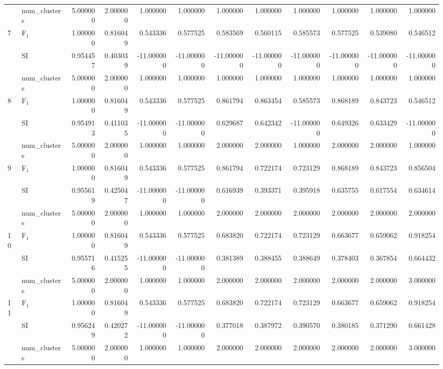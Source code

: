 \begin{tabular}{llrrrrrrrrrr}
 & num_clusters & 5.000000 & 2.000000 & 1.000000 & 1.000000 & 1.000000 & 1.000000 & 1.000000 & 1.000000 & 1.000000 & 1.000000 \\
\multirow[c]{3}{*}{7} & F$_1$ & 1.000000 & 0.816049 & 0.543336 & 0.577525 & 0.583569 & 0.560115 & 0.585573 & 0.577525 & 0.539080 & 0.546512 \\
 & SI & 0.954457 & 0.403039 & -11.000000 & -11.000000 & -11.000000 & -11.000000 & -11.000000 & -11.000000 & -11.000000 & -11.000000 \\
 & num_clusters & 5.000000 & 2.000000 & 1.000000 & 1.000000 & 1.000000 & 1.000000 & 1.000000 & 1.000000 & 1.000000 & 1.000000 \\
\multirow[c]{3}{*}{8} & F$_1$ & 1.000000 & 0.816049 & 0.543336 & 0.577525 & 0.861794 & 0.863454 & 0.585573 & 0.868189 & 0.843723 & 0.546512 \\
 & SI & 0.954913 & 0.411035 & -11.000000 & -11.000000 & 0.629687 & 0.642342 & -11.000000 & 0.649326 & 0.633429 & -11.000000 \\
 & num_clusters & 5.000000 & 2.000000 & 1.000000 & 1.000000 & 2.000000 & 2.000000 & 1.000000 & 2.000000 & 2.000000 & 1.000000 \\
\multirow[c]{3}{*}{9} & F$_1$ & 1.000000 & 0.816049 & 0.543336 & 0.577525 & 0.861794 & 0.722174 & 0.723129 & 0.868189 & 0.843723 & 0.856504 \\
 & SI & 0.955619 & 0.425047 & -11.000000 & -11.000000 & 0.616939 & 0.393371 & 0.395918 & 0.635755 & 0.617554 & 0.634614 \\
 & num_clusters & 5.000000 & 2.000000 & 1.000000 & 1.000000 & 2.000000 & 2.000000 & 2.000000 & 2.000000 & 2.000000 & 2.000000 \\
\multirow[c]{3}{*}{10} & F$_1$ & 1.000000 & 0.816049 & 0.543336 & 0.577525 & 0.683820 & 0.722174 & 0.723129 & 0.663677 & 0.659062 & 0.918254 \\
 & SI & 0.955716 & 0.415255 & -11.000000 & -11.000000 & 0.381389 & 0.388455 & 0.388649 & 0.378403 & 0.367854 & 0.664432 \\
 & num_clusters & 5.000000 & 2.000000 & 1.000000 & 1.000000 & 2.000000 & 2.000000 & 2.000000 & 2.000000 & 2.000000 & 3.000000 \\
\multirow[c]{3}{*}{11} & F$_1$ & 1.000000 & 0.816049 & 0.543336 & 0.577525 & 0.683820 & 0.722174 & 0.723129 & 0.663677 & 0.659062 & 0.918254 \\
 & SI & 0.956249 & 0.420272 & -11.000000 & -11.000000 & 0.377018 & 0.387972 & 0.390570 & 0.380185 & 0.371290 & 0.661428 \\
 & num_clusters & 5.000000 & 2.000000 & 1.000000 & 1.000000 & 2.000000 & 2.000000 & 2.000000 & 2.000000 & 2.000000 & 3.000000 \\
\bottomrule
\end{tabular}
